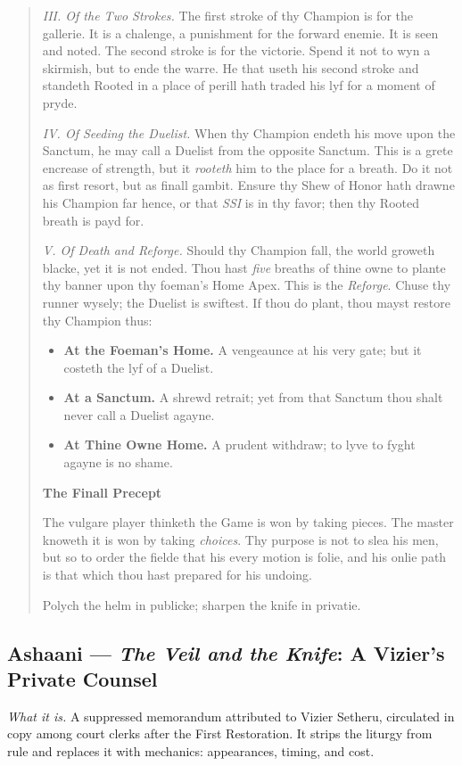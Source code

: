 \documentclass[11pt]{article}
\begin{document}
\begin{quote}
\textit{III. Of the Two Strokes.}
The first stroke of thy Champion is for the gallerie. It is a chalenge, a punishment for the forward enemie. It is seen and noted. The second stroke is for the victorie. Spend it not to wyn a skirmish, but to ende the warre. He that useth his second stroke and standeth Rooted in a place of perill hath traded his lyf for a moment of pryde.

\textit{IV. Of Seeding the Duelist.}
When thy Champion endeth his move upon the Sanctum, he may call a Duelist from the opposite Sanctum. This is a grete encrease of strength, but it \emph{rooteth} him to the place for a breath. Do it not as first resort, but as finall gambit. Ensure thy Shew of Honor hath drawne his Champion far hence, or that \emph{SSI} is in thy favor; then thy Rooted breath is payd for.

\textit{V. Of Death and Reforge.}
Should thy Champion fall, the world groweth blacke, yet it is not ended. Thou hast \emph{five} breaths of thine owne to plante thy banner upon thy foeman's Home Apex. This is the \emph{Reforge}. Chuse thy runner wysely; the Duelist is swiftest. If thou do plant, thou mayst restore thy Champion thus:
\begin{itemize}\itemsep0.2em
  \item \textbf{At the Foeman's Home.} A vengeaunce at his very gate; but it costeth the lyf of a Duelist.
  \item \textbf{At a Sanctum.} A shrewd retrait; yet from that Sanctum thou shalt never call a Duelist agayne.
  \item \textbf{At Thine Owne Home.} A prudent withdraw; to lyve to fyght agayne is no shame.
\end{itemize}

\medskip
\textbf{The Finall Precept}

The vulgare player thinketh the Game is won by taking pieces. The master knoweth it is won by taking \emph{choices}. Thy purpose is not to slea his men, but so to order the fielde that his every motion is folie, and his onlie path is that which thou hast prepared for his undoing.

Polych the helm in publicke; sharpen the knife in privatie.

\end{quote}

\clearpage

\subsection{Ashaani --- \textit{The Veil and the Knife}: A Vizier's Private Counsel}
\textit{What it is.} A suppressed memorandum attributed to Vizier Setheru, circulated in copy among court clerks after the First Restoration. It strips the liturgy from rule and replaces it with mechanics: appearances, timing, and cost.
\end{document}
